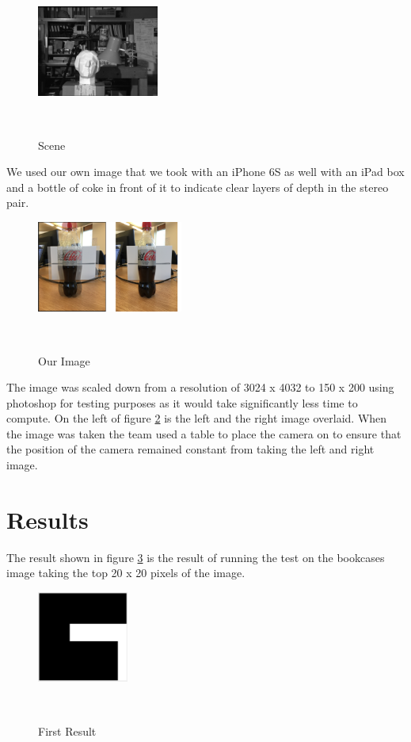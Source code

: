 \documentclass[twocolumn]{article}
\begin{document}
\begin{figure}[H]
\centering
  \includegraphics[width=40mm]{Figures/scene}
    \caption{Scene}~\label{fig:scene}
\end{figure} 

We used our own image that we took with an iPhone 6S as well with an iPad box and a bottle of coke in front of it to indicate clear layers of depth in the stereo pair. 

\begin{figure}[H]
\centering
  \includegraphics[height=30mm]{Figures/Coke_Image}
    \caption{Our Image}~\label{fig:CokeScene}
\end{figure} 

The image was scaled down from a resolution of 3024 x 4032 to 150 x 200 using photoshop for testing purposes as it would take significantly less time to compute. On the left of figure \ref{fig:CokeScene} is the left and the right image overlaid. When the image was taken the team used a table to place the camera on to ensure that the position of the camera remained constant from taking the left and right image. 



\section{Results}
\vspace{-1ex}

The result shown in figure \ref{fig:FirstResult} is the result of running the test on the bookcases image taking the top 20 x 20 pixels of the image. 

\begin{figure}[H]
\centering
  \includegraphics[height=30mm]{Figures/First_Result}
    \caption{First Result}~\label{fig:FirstResult}
\end{figure}  
\end{document}

